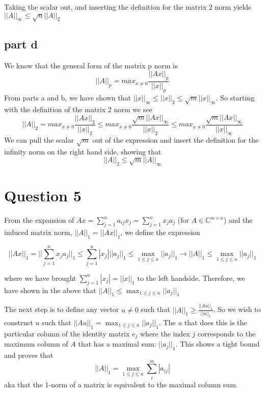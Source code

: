 \documentclass[a4paper,12pt]{article}
\begin{document}
Taking the scalar out, and inserting the definition for the matrix 2 norm yields $||A||_{\infty} \leq \sqrt n ||A||_2$
\subsection{part d}

We know that the general form of the matrix p norm is
\begin{equation}
||A||_p = max_{x\neq 0} \frac{|| Ax ||_p}{|| x||_p}
\end{equation}
From parts a and b, we have shown that $||x||_{\infty} \leq ||x||_2 \leq \sqrt m||x||_{\infty}$. So starting with the definition of the matrix 2 norm we see
\begin{equation}
||A||_2 = max_{x\neq 0} \frac{||Ax||_2}{||x||_2} \leq max_{x\neq 0} \frac{\sqrt m ||Ax||_{\infty}}{||x||_2} \leq max_{x\neq 0} \frac{\sqrt m ||Ax||_{\infty}}{||x||_{\infty}}
\end{equation}
We can pull the scalar $\sqrt m$ out of the expression and insert the definition for the infinity norm on the right hand side, showing that
\begin{equation}
||A||_2 \leq \sqrt m ||A||_{\infty}
\end{equation}





\section{Question 5}

From the expansion of $Ax = \sum_{j=1}^n a_{ij} x_j = \sum_{j=1}^n x_j a_j$ (for $A \in \mathbb{C}^{m \times n}$) and the induced matrix norm, $||A||_1 = ||Ax||_1$, we define the expression

\begin{equation}
||Ax||_1 = || \sum_{j=1}^n x_j a_{j}||_1 \leq \sum_{j=1}^n |x_j| || a_{j} ||_1 \leq \max_{1\leq j \leq n} ||a_j||_1 \rightarrow ||A||_1 \leq \max_{1\leq j \leq n} ||a_j||_1
\end{equation}

where we have brought $\sum_{j=1}^n |x_j|  = || x ||_1$ to the left handside. Therefore, we have shown in the above that $||A||_1 \leq  \max_{1\leq j \leq n } ||a_{j}||_1 $




The next step is to define any vector $u\neq0$ such that $||A||_1 \geq \frac{||Au||_1}{||u||_1}$. So we wish to construct $u$ such that $||Au||_1 = \max_{1\leq j \leq n } ||a_{j}||_1$. The $u$ that does this is the particular column of the identity matrix $e_j$ where the index $j$ corresponds to the maximum column of $A$ that has a maximal sum: $||a_j||_1$. This shows a tight bound and proves that 
\begin{equation}
||A||_1 =  \max_{1\leq j \leq n }\sum_{i}^m |a_{ij}|
\end{equation}
aka that the 1-norm of a matrix is equivalent to the maximal column sum.
\end{document}
